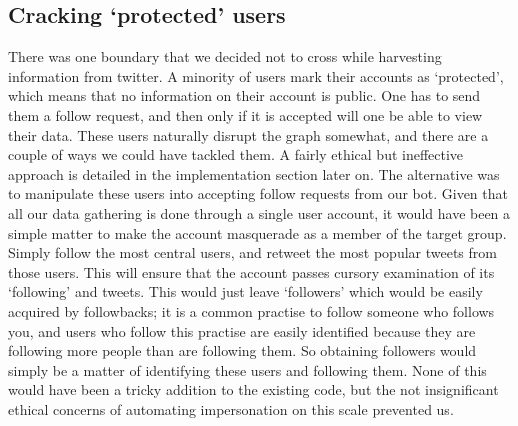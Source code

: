 \subsection{Cracking ‘protected’ users}
There was one boundary that we decided not to cross while harvesting information from twitter. A minority of users mark their accounts as ‘protected’, which means that no information on their account is public. One has to send them a follow request, and then only if it is accepted will one be able to view their data. These users naturally disrupt the graph somewhat, and there are a couple of ways we could have tackled them. A fairly ethical but ineffective approach is detailed in the implementation section later on. The alternative was to manipulate these users into accepting follow requests from our bot. Given that all our data gathering is done through a single user account, it would have been a simple matter to make the account masquerade as a member of the target group. Simply follow the most central users, and retweet the most popular tweets from those users. This will ensure that the account passes cursory examination of its ‘following’ and tweets. This would just leave ‘followers’ which would be easily acquired by followbacks; it is a common practise to follow someone who follows you, and users who follow this  practise are easily identified because they are following more people than are following them. So obtaining followers would simply be a matter of identifying these users and following them. None of this would have been a tricky addition to the existing code, but the not insignificant ethical concerns of automating impersonation on this scale prevented us.






